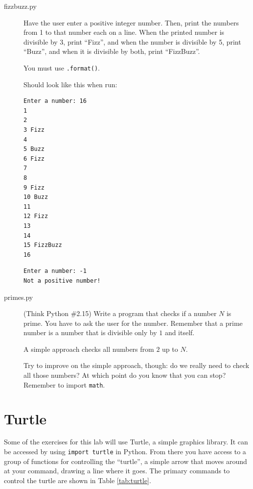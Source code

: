 \documentclass[11pt]{cselabheader}
\begin{document}
\begin{description}
  \item[fizzbuzz.py] Have the user enter a positive integer number. Then, print
    the numbers from 1 to that number each on a line. When the printed number is
    divisible by 3, print ``Fizz'', and when the number is divisible by 5, print
    ``Buzz'', and when it is divisible by both, print ``FizzBuzz''.

    You must use \lstinline!.format()!.

    Should look like this when run:
    \begin{lstlisting}[style=bash]
Enter a number: 16
1
2
3 Fizz
4
5 Buzz
6 Fizz
7
8
9 Fizz
10 Buzz
11
12 Fizz
13
14
15 FizzBuzz
16
    \end{lstlisting}
    \begin{lstlisting}[style=bash]
Enter a number: -1
Not a positive number!
    \end{lstlisting}

  \item[primes.py] (Think Python \#2.15) Write a program that checks if a number
    $N$ is prime. You have to ask the user for the number. Remember that a prime
    number is a number that is divisible only by $1$ and itself.

    A simple approach checks all numbers from $2$ up to $N$.

    Try to improve on the simple approach, though: do we really need to check
    all those numbers? At which point do you know that you can stop? Remember to
    import \lstinline!math!.

\end{description}

\pagebreak
\section{Turtle}

Some of the exercises for this lab will use Turtle, a simple graphics library.
It can be accessed by using \lstinline{import turtle} in Python. From there you
have access to a group of functions for controlling the ``turtle'', a simple
arrow that moves around at your command, drawing a line where it goes. The
primary commands to control the turtle are shown in Table \ref{tab:turtle}.
\end{document}
